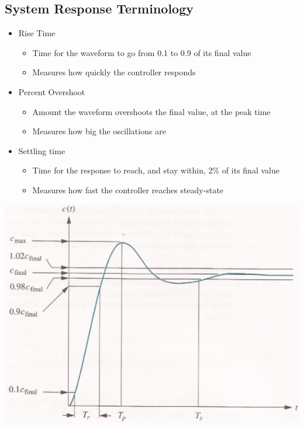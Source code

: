 \documentclass[10pt]{article}
\begin{document}
\subsection*{System Response Terminology}
\begin{itemize}
	\item Rise Time
	\begin{itemize}
        \item Time for the waveform to go from 0.1 to 0.9 of its final value
        \item Measures how quickly the controller responds
    \end{itemize}
	\item Percent Overshoot
	\begin{itemize}
        \item Amount the waveform overshoots the final value, at the peak time
        \item Measures how big the oscillations are
    \end{itemize}
	\item Settling time
	\begin{itemize}
        \item Time for the response to reach, and stay within, 2\% of its final value
        \item Measures how fast the controller reaches steady-state
    \end{itemize}
\end{itemize}
\begin{center} 
	\includegraphics*[width=\textwidth]{L2_18.png} 
\end{center}
\end{document}
